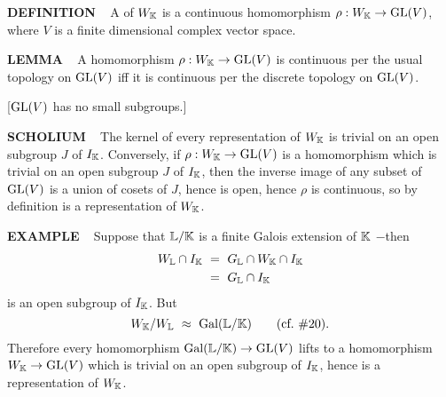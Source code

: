 \vspace{0.1cm}


\begin{x}{\small\bf DEFINITION} \ %
A  of $W_{\mathbb{K}}$ is a continuous homomorphism 
$\rho:W_{\mathbb{K}} \rightarrow \text{GL}(V)$, where $V$ is a finite dimensional complex vector space.
\end{x}

\vspace{0.1cm}


\begin{x}{\small\bf LEMMA} \ %
A homomorphism 
$\rho:W_{\mathbb{K}} \rightarrow \text{GL}(V)$ 
is continuous per the usual topology on $\text{GL}(V)$ iff it is continuous per the discrete topology on $\text{GL}(V)$.

\vspace{0.1cm}

[$\text{GL}(V)$ has no small subgroups.]
\end{x}

\vspace{0.1cm}

\begin{x}{\small\bf SCHOLIUM} \ %
The kernel of every representation of $W_{\mathbb{K}}$ is trivial on an open subgroup $J$ of $I_{\mathbb{K}}$.  
Conversely, if $\rho:W_{\mathbb{K}} \rightarrow \text{GL}(V)$ is a homomorphism which is trivial on an open subgroup $J$ of $I_{\mathbb{K}}$, then 
the inverse image of any subset of $\text{GL}(V)$ is a union of cosets of $J$, hence is open, hence $\rho$ is continuous, so by definition is a representation of $W_{\mathbb{K}}$.
\end{x}

\vspace{0.1cm}

\begin{x}{\small\bf EXAMPLE} \ %
Suppose that $\mathbb{L} / \mathbb{K}$ is a finite Galois extension of $\mathbb{K}$ $-$then 
\begin{align*}
W_\LL \cap I_\K \ 
&=\  G_\LL \cap W_\K \cap I_\K \\
&=\ G_\LL \cap I_\K
\end{align*}
is an open subgroup of $I_{\mathbb{K}}$.  But
\[
W_{\mathbb{K}} / W_{\mathbb{L}} \ \approx \  \text{Gal}(\mathbb{L} / \mathbb{K}) \qquad (\text{cf.} \ \#20).
\]
Therefore every homomorphism $\text{Gal}(\mathbb{L}/\mathbb{K}) \rightarrow \text{GL}(V)$ lifts to a homomorphism $W_{\mathbb{K}} \rightarrow \text{GL}(V)$ which is trivial on an open subgroup of $I_{\mathbb{K}}$, hence is a representation of $W_{\mathbb{K}}$.
\end{x}

\vspace{0.1cm}

